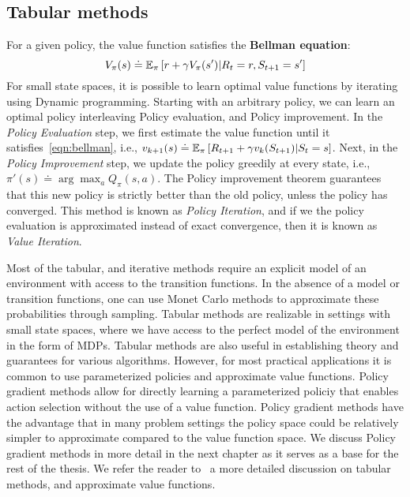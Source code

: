 \subsection{Tabular methods}
For a given policy, the value function satisfies the \textbf{Bellman equation}:
\begin{equation}
	\label{eqn:bellman} V_\pi(s) \doteq \mathbb{E}_\pi \left[r + \gamma V_\pi(s') | R_t = r, S_{t+1} = s'
		\right]
\end{equation} For small state spaces, it is possible to learn optimal value functions by
iterating using Dynamic programming.
Starting with an arbitrary policy, we can learn an optimal policy interleaving Policy evaluation,
and Policy improvement.
In the \textit{Policy Evaluation} step, we first estimate the value function until it
satisfies~\ref{eqn:bellman}, i.e., $v_{k+1}(s) \doteq \mathbb{E}_\pi \left[R_{t+1} + \gamma v_k(S_{t+1})
		|S_t =s\right]$.
Next, in the \textit{Policy Improvement} step, we update the policy greedily at every state, i.e.,
$\pi'(s) \doteq \arg \max_{a} Q_\pi(s,a)$.
The Policy improvement theorem guarantees that this new policy is strictly better than the old
policy, unless the policy has converged.
This method is known as \textit{Policy Iteration}, and if we the policy evaluation is approximated
instead of exact convergence, then it is known as \textit{Value Iteration}.

Most of the tabular, and iterative methods require an explicit model of an environment with access
to the transition functions.
In the absence of a model or transition functions, one can use Monet Carlo methods to approximate
these probabilities through sampling.
Tabular methods are realizable in settings with small state spaces, where we have access to the
perfect model of the environment in the form of MDPs.
Tabular methods are also useful in establishing theory and guarantees for various algorithms.
However, for most practical applications it is common to use parameterized policies and approximate
value functions.
Policy gradient methods allow for directly learning a parameterized policiy that enables action
selection without the use of a value function.
Policy gradient methods have the advantage that in many problem settings the policy space could be
relatively simpler to approximate compared to the value function space.
We discuss Policy gradient methods in more detail in the next chapter as it serves as a base for
the rest of the thesis.
We refer the reader to~\cite{suttonReinforcement2018} a more detailed discussion on tabular
methods, and approximate value functions.


